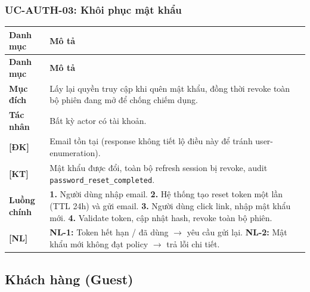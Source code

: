 \subsubsection{UC-AUTH-03: Khôi phục mật khẩu}
\begingroup
\renewcommand{\arraystretch}{1.3}
\begin{longtable}{|>{\centering\arraybackslash}m{3cm}|>{\raggedright\arraybackslash}m{12cm}|}
\hline
\textbf{Danh mục} & \textbf{Mô tả} \\ \hline
\endfirsthead
\hline
\textbf{Danh mục} & \textbf{Mô tả} \\ \hline
\endhead
\hline
\endfoot
\textbf{Mục đích} & Lấy lại quyền truy cập khi quên mật khẩu, đồng thời revoke toàn bộ phiên đang mở để chống chiếm dụng. \\
\hline
\textbf{Tác nhân} & Bất kỳ actor có tài khoản. \\
\hline
\textbf{[ĐK]} & Email tồn tại (response không tiết lộ điều này để tránh user-enumeration). \\
\hline
\textbf{[KT]} & Mật khẩu được đổi, toàn bộ refresh session bị revoke, audit \texttt{password\_reset\_completed}. \\
\hline
\textbf{Luồng chính} & \textbf{1.} Người dùng nhập email. \textbf{2.} Hệ thống tạo reset token một lần (TTL 24h) và gửi email. \textbf{3.} Người dùng click link, nhập mật khẩu mới. \textbf{4.} Validate token, cập nhật hash, revoke toàn bộ phiên. \\
\hline
\textbf{[NL]} & \textbf{NL-1:} Token hết hạn / đã dùng $\rightarrow$ yêu cầu gửi lại. \textbf{NL-2:} Mật khẩu mới không đạt policy $\rightarrow$ trả lỗi chi tiết. \\
\hline
\end{longtable}
\endgroup

\subsection{Khách hàng (Guest)}

